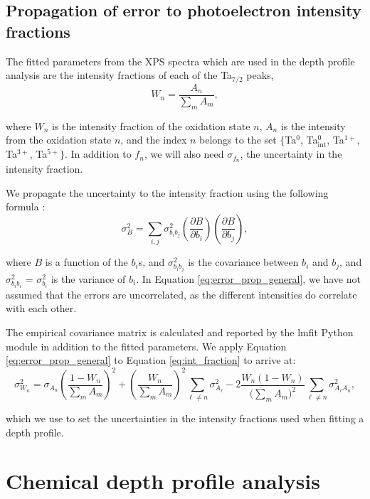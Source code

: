 \documentclass{WileyMSP-template}
\begin{document}
\subsection{Propagation of error to photoelectron intensity fractions}

The fitted parameters from the XPS spectra which are used in the depth profile analysis are the intensity fractions of each of the Ta$_{7/2}$ peaks, 
\begin{equation} \label{eq:int_fraction}
    W_n = \frac{A_n}{\sum\limits_m A_m},
\end{equation}

where $W_n$ is the intensity fraction of the oxidation state $n$, $A_n$ is the intensity from the oxidation state $n$, and the index $n$ belongs to the set $\{$Ta$^0$, Ta$^0_\text{int}$, Ta$^{1+}$, Ta$^{3+}$, Ta$^{5+}\}$. In addition to $f_n$, we will also need $\sigma_{f_n}$, the uncertainty in the intensity fraction.

We propagate the uncertainty to the intensity fraction using the following formula \cite{bevington_error_2003}:
\begin{equation} \label{eq:error_prop_general}
    \sigma_B^2 = \sum_{i,j} \sigma_{b_ib_j}^2\left( \frac{\partial B}{\partial b_i}\right)\left( \frac{\partial B}{\partial b_j}\right),
\end{equation}

where $B$ is a function of the $b_i$s, and $\sigma_{b_ib_j}^2$ is the covariance between $b_i$ and $b_j$, and $\sigma_{b_ib_i}^2$ =  $\sigma_{b_i}^2$ is the variance of $b_i$. In Equation \ref{eq:error_prop_general}, we have not assumed that the errors are uncorrelated, as the different intensities do correlate with each other.

The empirical covariance matrix is calculated and reported by the lmfit Python module in addition to the fitted parameters. We apply Equation \ref{eq:error_prop_general} to Equation \ref{eq:int_fraction} to arrive at:
\begin{equation}
    \sigma_{W_n}^2 = \sigma_{A_n} \left( \frac{1-W_n}{\sum\limits_m A_m} \right)^2 + \left( \frac{W_n}{\sum\limits_m A_m} \right)^2 \sum\limits_{\ell \neq n}\sigma_{A_\ell}^2 - 2\frac{W_n(1-W_n)}{\bigg(\sum\limits_m A_m\bigg)^2} \sum\limits_{\ell{}\neq n}\sigma_{A_\ell{}A_n}^2,
\end{equation}

which we use to set the uncertainties in the intensity fractions used when fitting a depth profile.

\section{Chemical depth profile analysis}
\end{document}
